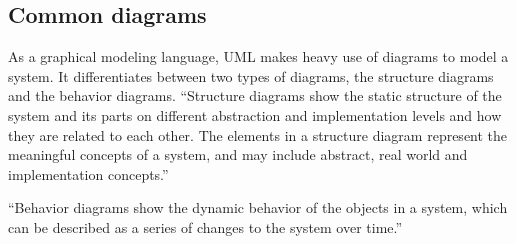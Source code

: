\subsection{Common diagrams}
As a graphical modeling language, UML makes heavy use of diagrams to model a system. It differentiates between two types of diagrams, the structure diagrams and the behavior diagrams. \linebreak
“Structure diagrams show the static structure of the system and its parts on different abstraction and implementation levels and how they are related to each other. The elements in a structure diagram represent the meaningful concepts of a system, and may include abstract, real world and implementation concepts.” \citep{umldiagrams.org2015}

“Behavior diagrams show the dynamic behavior of the objects in a system, which can be described as a series of changes to the system over time.” \citep{umldiagrams.org2015}
